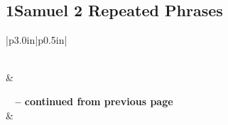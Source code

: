 \subsection{1Samuel 2 Repeated Phrases}


\normalsize
 
\begin{center}
\begin{longtable}{|p{3.0in}|p{0.5in}|}
\caption[1Samuel 2 Repeated Phrases]{1Samuel 2 Repeated Phrases}\label{table:Repeated Phrases 1Samuel 2} \\
\hline {} &  \\ \hline 
\endfirsthead
 
{{\bfseries \tablename\ \thetable{} -- continued from previous page}} \\  
\hline {} &  \\ \hline 
\endhead
 

\end{longtable}
\end{center}
